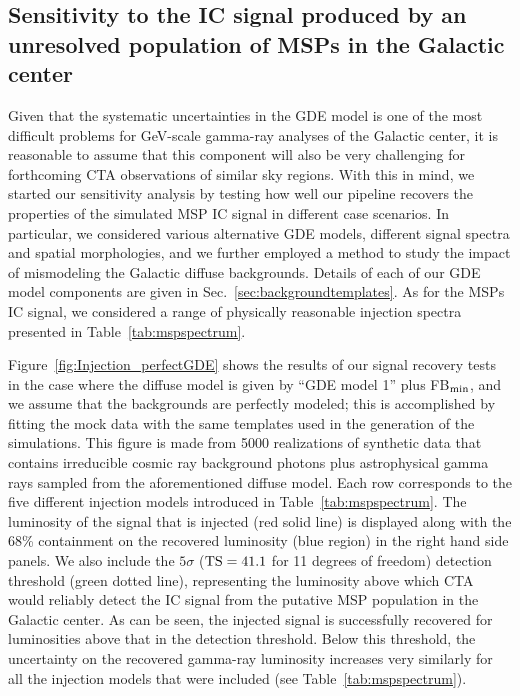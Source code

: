 \documentclass[doublespace,nopageskip]{VTthesis}
\begin{document}
\subsection{Sensitivity to the IC signal produced by an unresolved population of MSPs in the Galactic center}
\label{subsec:sensitivityICMSPs}

Given that the systematic uncertainties in the GDE model is one of the most difficult problems for GeV-scale gamma-ray analyses of the Galactic center, it is reasonable to assume that this component will also be very challenging for forthcoming CTA observations of similar sky regions. With this in mind, we started our sensitivity analysis by testing how well our pipeline recovers the properties of the simulated MSP IC signal in different case scenarios. In particular, we considered various alternative GDE models, different signal spectra and spatial morphologies, and we further employed a method to study the impact of mismodeling the Galactic diffuse backgrounds. Details of each of our GDE model components are given in Sec.~\ref{sec:backgroundtemplates}. As for the MSPs IC signal, we considered a range of physically reasonable injection spectra presented in Table~\ref{tab:mspspectrum}.

Figure~\ref{fig:Injection_perfectGDE} shows the results of our signal recovery tests in the case where the diffuse model is given by ``GDE model 1'' plus FB$_{\rm min}$, and we assume that the backgrounds are perfectly modeled; this is accomplished by fitting the mock data with the same templates used in the generation of the simulations. This figure is made from 5000 realizations of synthetic data that contains irreducible cosmic ray background photons plus astrophysical gamma rays sampled from the aforementioned diffuse model. Each row corresponds to the five different injection models introduced in Table~\ref{tab:mspspectrum}. The luminosity of the signal that is injected (red solid line) is displayed along with the 68\% containment on the recovered luminosity (blue region) in the right hand side panels. We also include the $5\sigma$ (${\rm TS}=41.1$ for 11 degrees of freedom) detection threshold (green dotted line), representing the luminosity above which CTA would reliably detect the IC signal from the putative MSP population in the Galactic center. As can be seen, the injected signal is successfully recovered for luminosities above that in the detection threshold. Below this threshold, the uncertainty on the recovered gamma-ray luminosity increases very similarly for all the injection models that were included (see Table~\ref{tab:mspspectrum}).
\end{document}
